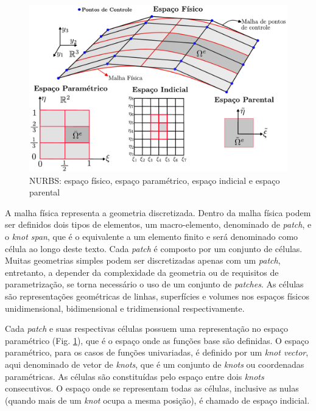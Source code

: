 \documentclass[tese_patricia]{subfiles}
\begin{document}
\begin{figure}[htb!]
	\centering 
	\includegraphics[scale=0.7,trim=0cm 0cm 0cm 0cm, clip=true]{Imagens/Cap3/espacos_NURBS.pdf}	
	\caption{NURBS: espaço físico, espaço paramétrico, espaço indicial e espaço parental}
	\label{fig:espacos_NURBS}
\end{figure}

A malha física representa a geometria discretizada. Dentro da malha física podem ser definidos dois tipos de elementos, um macro-elemento, denominado de \textit{patch}, e o \textit{knot span}, que é o equivalente a um elemento finito e será denominado como célula ao longo deste texto. Cada \textit{patch} é composto por um conjunto de células. Muitas geometrias simples podem ser discretizadas apenas com um \textit{patch}, entretanto, a depender da complexidade da geometria ou de requisitos de parametrização, se torna necessário o uso de um conjunto de \textit{patches}. As células são representações geométricas de linhas, superfícies e volumes nos espaços físicos unidimensional, bidimensional e tridimensional respectivamente.

Cada \textit{patch} e suas respectivas células possuem uma representação no espaço paramétrico (Fig. \ref{fig:espacos_NURBS}), que é o espaço onde as funções base são definidas. O espaço paramétrico, para os casos de funções univariadas, é definido por um \textit{knot vector}, aqui denominado de vetor de \textit{knots}, que é um conjunto de \textit{knots} ou coordenadas paramétricas. As células são constituídas pelo espaço entre dois \textit{knots} consecutivos. O espaço onde se representam todas as células, inclusive as nulas (quando mais de um \textit{knot} ocupa a mesma posição), é chamado de espaço indicial.
\end{document}
